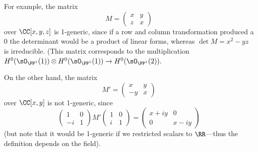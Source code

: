 \begin{example}
For example, the matrix 
$$
M = \begin{pmatrix}
 x &y\\
 z&x
\end{pmatrix}
$$
over $\CC[x,y,z]$ is  1-generic, since if a row and column transformation produced a 0 the determinant would be a product of linear forms, whereas
$\det M = x^2-yz$ is irreducible. (This matrix corresponds to the multiplication 
$H^{0}(\sO_{\PP^{1}}(1)) \otimes
H^{0}(\sO_{\PP^{1}}(1)) 
\to H^{0}(\sO_{\PP^{1}}(2)).
$

On the other hand, the matrix
$$
M' = \begin{pmatrix}
 x &y\\
 -y&x
\end{pmatrix}
$$
over $\CC[x,y]$ is not 1-generic, since
$$
\begin{pmatrix}
1&0\\
-i&1 
\end{pmatrix}
M'
\begin{pmatrix}
 1&0\\
 i&1
\end{pmatrix}
= 
\begin{pmatrix}
 x+iy&0\\
 0&x-iy
\end{pmatrix}
$$
(but note that it would be 1-generic if we restricted scalars to $\RR$---thus the definition depends on the field).
\end{example}

